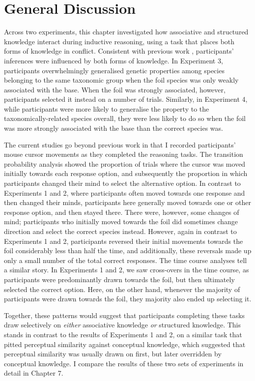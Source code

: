 
\section{General Discussion}

Across two experiments, this chapter investigated how
associative and structured knowledge interact during inductive reasoning,
using a task that places both forms of knowledge in conflict.
Consistent with previous work \citep[][Chapter 5]{Bright,Crisp-Bright2010,Bright2014a},
participants' inferences were influenced by both forms of knowledge.
In Experiment 3, participants overwhelmingly generalised genetic properties
among species belonging to the same taxonomic group
when the foil species was only weakly associated with the base.
When the foil was strongly associated, however,
participants selected it instead on a number of trials.
Similarly, in Experiment 4, while participants were more likely to
generalise the property to the taxonomically-related species overall,
they were less likely to do so when the foil was more strongly associated
with the base than the correct species was.

The current studies go beyond previous work
in that I recorded participants' mouse cursor movements
as they completed the reasoning tasks.
The transition probability analysis
showed the proportion of trials where the cursor was
moved initially towards each response option,
and subsequently the proportion in which
participants changed their mind to select the alternative option.
In contrast to Experiments 1 and 2,
where participants often moved towards one response and then changed their minds,
participants here generally moved towards one or other response option,
and then stayed there.
There were, however, some changes of mind;
participants who initially moved towards the foil
did sometimes change direction and select the correct species instead.
However, again in contrast to Experiments 1 and 2,
participants reversed their initial movements towards the foil
considerably less than half the time,
and additionally, these reversals made up only a small number
of the total correct responses.
The time course analyses tell a similar story.
In Experiments 1 and 2,
we saw cross-overs in the time course,
as participants were predominantly drawn towards the foil,
but then ultimately selected the correct option.
Here, on the other hand,
whenever the majority of participants were drawn towards the foil,
they majority also ended up selecting it.

Together, these patterns would suggest that
participants completing these tasks draw selectively on
\emph{either} associative knowledge \emph{or} structured knowledge.
This stands in contrast to the results of Experiments 1 and 2,
on a similar task that pitted perceptual similarity against conceptual knowledge,
which suggested that perceptual similarity was usually drawn on first,
but later overridden by conceptual knowledge.
I compare the results of these two sets of experiments
in detail in Chapter 7.


